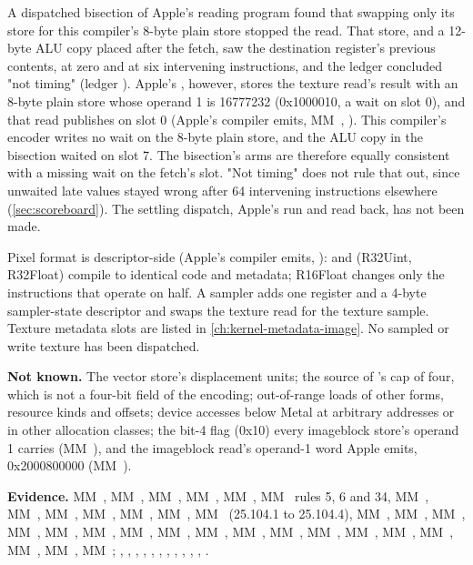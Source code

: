 A dispatched bisection of Apple's reading program found that swapping only its store for this compiler's 8-byte plain
store stopped the read. That store, and a 12-byte ALU copy placed after the fetch, saw the destination register's
previous contents, at zero and at six intervening instructions, and the ledger concluded "not timing" (ledger
). Apple's , however, stores the texture read's
result with an 8-byte plain store whose operand 1 is 16777232 (0x1000010, a wait on slot 0), and that read publishes on
slot 0 (Apple's compiler emits, MM~, ). This compiler's encoder writes no
wait on the 8-byte plain store, and the ALU copy in the bisection waited on slot 7. The bisection's arms are therefore
equally consistent with a missing wait on the fetch's slot. "Not timing" does not rule that out, since unwaited late
values stayed wrong after 64 intervening instructions elsewhere (\cref{sec:scoreboard}). The settling dispatch, Apple's
 run and read back, has not been made.

Pixel format is descriptor-side (Apple's compiler emits, ):
 and  (R32Uint, R32Float) compile to identical code and metadata; R16Float changes
only the instructions that operate on half. A sampler adds one register and a 4-byte sampler-state descriptor and swaps the
texture read for the texture sample. Texture metadata slots are listed in \cref{ch:kernel-metadata-image}. No sampled or write texture has been dispatched.

\textbf{Not known.} The vector store's displacement units; the source of 's cap of four, which is not a four-bit field of the
encoding; out-of-range loads
of other forms, resource kinds and offsets; device accesses below Metal at arbitrary addresses or in other allocation
classes; the bit-4 flag (0x10) every imageblock store's operand 1 carries (MM~), and the imageblock read's
operand-1 word Apple emits, 0x2000800000 (MM~).

\textbf{Evidence.} MM~, MM~, MM~, MM~, MM~, MM~ rules 5, 6 and 34, MM~, MM~, MM~, MM~, MM~,
MM~, MM~ (25.104.1 to 25.104.4), MM~, MM~, MM~, MM~, MM~, MM~,
MM~, MM~, MM~, MM~, MM~, MM~, MM~, MM~, MM~, MM~,
MM~, MM~; , , ,
, , ,
, , ,
, , .
